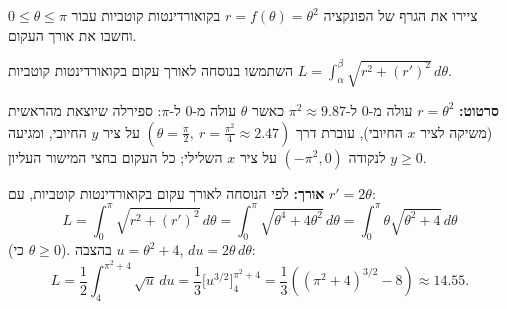 
\begin{question}
ציירו את הגרף של הפונקציה $r=f(\theta)=\theta^2$ בקואורדינטות קוטביות עבור $0\le\theta\le\pi$ וחשבו את אורך העקום.
\end{question}

\begin{hint}
השתמשו בנוסחה לאורך עקום בקואורדינטות קוטביות $L=\int_\alpha^\beta\sqrt{r^2+(r')^2}\,d\theta$.
\end{hint}

\begin{solution}
\textbf{סרטוט:} $r=\theta^2$ עולה מ-$0$ ל-$\pi^2\approx9.87$ כאשר $\theta$ עולה מ-$0$ ל-$\pi$: ספירלה שיוצאת מהראשית (משיקה לציר $x$ החיובי), עוברת דרך $\left(\theta=\frac\pi2,\ r=\frac{\pi^2}4\approx2.47\right)$ על ציר $y$ החיובי, ומגיעה לנקודה $(-\pi^2,0)$ על ציר $x$ השלילי; כל העקום בחצי המישור העליון $y\ge0$.

\textbf{אורך:} לפי הנוסחה לאורך עקום בקואורדינטות קוטביות, עם $r'=2\theta$:
\[
L=\int_0^\pi\sqrt{r^2+(r')^2}\,d\theta=\int_0^\pi\sqrt{\theta^4+4\theta^2}\,d\theta=\int_0^\pi\theta\sqrt{\theta^2+4}\,d\theta
\]
(כי $\theta\ge0$). בהצבה $u=\theta^2+4$, $du=2\theta\,d\theta$:
\[
L=\frac12\int_4^{\pi^2+4}\sqrt u\,du=\frac13\Big[u^{3/2}\Big]_4^{\pi^2+4}=\frac13\left((\pi^2+4)^{3/2}-8\right)\approx14.55.
\]
\end{solution}
